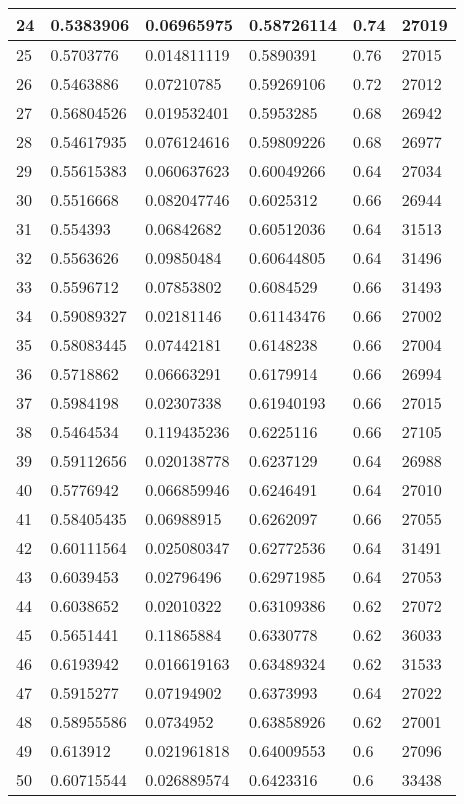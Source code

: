 \begin{longtable}{|l|l|l|l|l|l|}
24 & 0.5383906 & 0.06965975 & 0.58726114 & 0.74 & 27019 \\ \hline 
25 & 0.5703776 & 0.014811119 & 0.5890391 & 0.76 & 27015 \\ \hline 
26 & 0.5463886 & 0.07210785 & 0.59269106 & 0.72 & 27012 \\ \hline 
27 & 0.56804526 & 0.019532401 & 0.5953285 & 0.68 & 26942 \\ \hline 
28 & 0.54617935 & 0.076124616 & 0.59809226 & 0.68 & 26977 \\ \hline 
29 & 0.55615383 & 0.060637623 & 0.60049266 & 0.64 & 27034 \\ \hline 
30 & 0.5516668 & 0.082047746 & 0.6025312 & 0.66 & 26944 \\ \hline 
31 & 0.554393 & 0.06842682 & 0.60512036 & 0.64 & 31513 \\ \hline 
32 & 0.5563626 & 0.09850484 & 0.60644805 & 0.64 & 31496 \\ \hline 
33 & 0.5596712 & 0.07853802 & 0.6084529 & 0.66 & 31493 \\ \hline 
34 & 0.59089327 & 0.02181146 & 0.61143476 & 0.66 & 27002 \\ \hline 
35 & 0.58083445 & 0.07442181 & 0.6148238 & 0.66 & 27004 \\ \hline 
36 & 0.5718862 & 0.06663291 & 0.6179914 & 0.66 & 26994 \\ \hline 
37 & 0.5984198 & 0.02307338 & 0.61940193 & 0.66 & 27015 \\ \hline 
38 & 0.5464534 & 0.119435236 & 0.6225116 & 0.66 & 27105 \\ \hline 
39 & 0.59112656 & 0.020138778 & 0.6237129 & 0.64 & 26988 \\ \hline 
40 & 0.5776942 & 0.066859946 & 0.6246491 & 0.64 & 27010 \\ \hline 
41 & 0.58405435 & 0.06988915 & 0.6262097 & 0.66 & 27055 \\ \hline 
42 & 0.60111564 & 0.025080347 & 0.62772536 & 0.64 & 31491 \\ \hline 
43 & 0.6039453 & 0.02796496 & 0.62971985 & 0.64 & 27053 \\ \hline 
44 & 0.6038652 & 0.02010322 & 0.63109386 & 0.62 & 27072 \\ \hline 
45 & 0.5651441 & 0.11865884 & 0.6330778 & 0.62 & 36033 \\ \hline 
46 & 0.6193942 & 0.016619163 & 0.63489324 & 0.62 & 31533 \\ \hline 
47 & 0.5915277 & 0.07194902 & 0.6373993 & 0.64 & 27022 \\ \hline 
48 & 0.58955586 & 0.0734952 & 0.63858926 & 0.62 & 27001 \\ \hline 
49 & 0.613912 & 0.021961818 & 0.64009553 & 0.6 & 27096 \\ \hline 
50 & 0.60715544 & 0.026889574 & 0.6423316 & 0.6 & 33438 \\ \hline 
\end{longtable}
